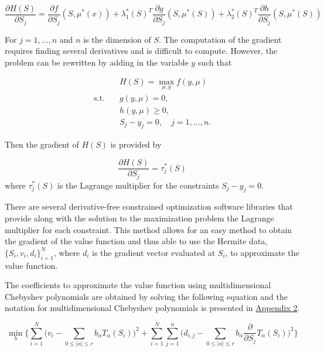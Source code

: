 \documentclass[12pt]{article}
\begin{document}
\begin{equation*}
  \frac{\partial H(S)}{\partial S_j} =\frac{\partial f}{\partial S_j}(S, \mu^*(x)) + \lambda_1^*(S)^T\frac{\partial g}{\partial S_j}(S, \mu^*(S)) + \lambda_2^*(S)^T\frac{\partial h}{\partial S_j}(S, \mu^*(S))
\end{equation*}

For $j=1,\dots,n$ and $n$ is the dimension of $S$. The computation of the gradient requires finding several derivatives and is difficult to compute. However, the problem can be rewritten by adding in the variable $y$ such that

\begin{equation}
  \begin{aligned}
    & H(S)=\max_{\mu,y} f(y,\mu) \\
    \text{s.t.}\quad & g(y, \mu)=0,\\
    & h(y,\mu) \geq 0,\\
    & S_j-y_j=0,\quad j=1,\dots,n.
  \end{aligned}
  \label{equationB}
\end{equation}

Then the gradient of $H(S)$ is provided by

\begin{equation*}
  \frac{\partial H(S)}{\partial S_j} = \tau^*_j(S)
\end{equation*}
where $\tau^*_j(S)$ is the Lagrange multiplier for the constraints $S_j-y_j=0$.

There are several derivative-free constrained optimization software libraries that provide along with the solution to the maximization problem the Lagrange multiplier for each constraint. This method allows for an easy method to obtain the gradient of the value function and thus able to use the Hermite data, $\{S_i,v_i,d_i\}_{i=1}^N$, where $d_i$ is the gradient vector evaluated at $S_i$, to approximate the value function.

The coefficients to approximate the value function using multidimensional Chebyshev polynomials are obtained by solving the following equation and the notation for multidimensional Chebyshev polynomials is presented in \hyperref[multicheb]{Appendix 2}.

\begin{equation*}
  \min_b \Bigg \{\sum_{i=1}^N \bigg (v_i-\sum_{0\leq |\alpha|\leq r}b_\alpha T_\alpha(S_i) \bigg )^2+\sum_{i=1}^N \sum_{j=1}^{n} \bigg ( d_{i,j} - \sum_{0\leq |\alpha|\leq r}b_\alpha \frac{\partial}{\partial S_j}T_\alpha(S_i) \bigg )^2 \Bigg \}
\end{equation*}
\end{document}
